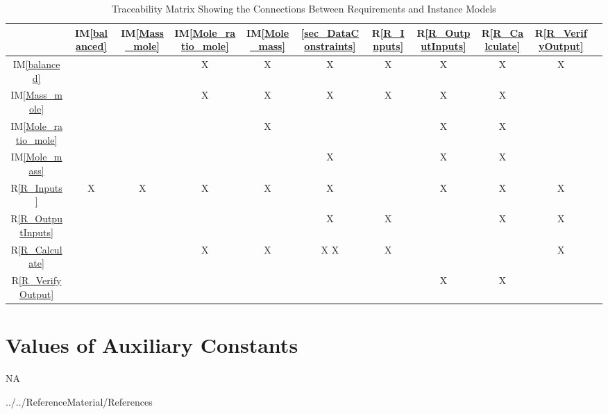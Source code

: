\documentclass[12pt]{article}
\newcommand{\iref}[1]{IM\ref{#1}}
\newcommand{\rref}[1]{R\ref{#1}}
\begin{document}
{\begin{table}[h!]
\centering
\begin{tabular}{|c|c|c|c|c|c|c|c|c|c|c|}
\hline
	& \iref{balanced} & \iref{Mass_mole}& \iref{Mole_ratio_mole}& \iref{Mole_mass} & \ref{sec_DataConstraints}& \rref{R_Inputs}& \rref{R_OutputInputs} & \rref{R_Calculate} & \rref{R_VerifyOutput} \\
\hline
\iref{balanced}  & & & X& X&X & X& X& X& X \\ \hline
\iref{Mass_mole}            & & & X&X & X& X&X & X&  \\ \hline
\iref{Mole_ratio_mole}     & & & & X& & &X &X &  \\ \hline
\iref{Mole_mass}             & & & & &X & &X & X& \\ \hline
\rref{R_Inputs}                &X & X&X &X & X& & X& X&X  \\ \hline
\rref{R_OutputInputs}    & & & & & X& X& & X&X  \\ \hline
\rref{R_Calculate}    & & & X& X&X X& X& & &X  \\ \hline
\rref{R_VerifyOutput}   & & & & & & & X&X & \\ \hline
\hline
\end{tabular}
\caption{Traceability Matrix Showing the Connections Between Requirements and Instance Models}
\label{Table:R_trace}
\end{table}
}
\newpage

\section{Values of Auxiliary Constants}
NA 

\newpage

 {../../ReferenceMaterial/References}

\newpage
\end{document}

